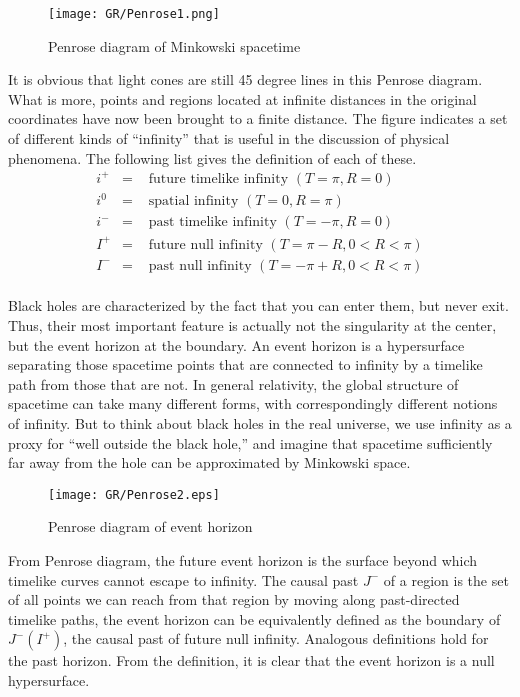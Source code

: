 \begin{figure}
\centering
\texttt{[image: GR/Penrose1.png]}
\caption{Penrose diagram of Minkowski spacetime}
\end{figure}

\noindent
It is obvious that light cones are still 45 degree lines in this Penrose diagram. 
What is more, points and regions located at infinite distances in the original coordinates have now been brought to a finite distance. 
The figure indicates a set of different kinds of ``infinity'' that is useful in the discussion of physical phenomena. The following list gives the definition of each of these.
\begin{eqnarray}
i^{+} &=& \mbox{ future timelike infinity } (T = \pi, R = 0) \nonumber \\
i^{0} &=& \mbox{ spatial infinity } (T = 0, R = \pi) \nonumber \\
i^{-} &=& \mbox{ past timelike infinity } (T = -\pi, R = 0) \nonumber \\
I^{+} &=& \mbox{ future null infinity } (T = \pi - R, 0 < R < \pi) \nonumber \\
I^{-} &=& \mbox{ past null infinity } (T = -\pi + R, 0 < R < \pi) \nonumber
\end{eqnarray}
\\
Black holes are characterized by the fact that you can enter them, but never exit. 
Thus, their most important feature is actually not the singularity at the center, but the event horizon at the boundary. 
An event horizon is a hypersurface separating those spacetime points that are connected to infinity by a timelike path from those that are not. 
In general relativity, the global structure of spacetime can take many different forms, with correspondingly  different notions of infinity. 
But to think about black holes in the real universe, we use infinity as a proxy for ``well outside the black hole,'' and imagine that spacetime sufficiently far away from the hole can be approximated by Minkowski space.

\begin{figure}[!htb]
\centering
\texttt{[image: GR/Penrose2.eps]}
\caption{Penrose diagram of event horizon}
\end{figure}

\noindent
From Penrose diagram, the future event horizon is the surface beyond which timelike curves cannot escape to infinity. 
The causal past $J^{-}$ of a region is the set of all points we can reach from that region by moving along past-directed timelike paths, the event horizon can be
equivalently defined as the boundary of $J^{-}(I^+)$, the causal past of future null infinity. Analogous definitions hold for the past horizon. From the definition, it is clear that the event horizon is a null hypersurface.


